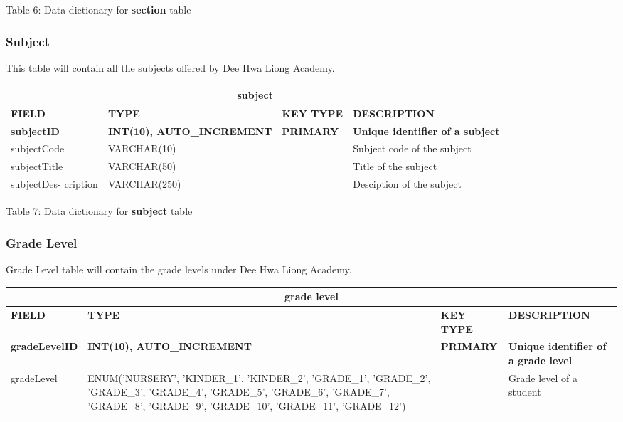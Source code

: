 \documentclass[11pt,a4paper,titlepage]{article}
\begin{document}
\vspace{.5cm}
\begin{center}
    Table 6: Data dictionary for \textbf{section} table
\end{center}

\newpage

\subsubsection{Subject}

This table will contain all the subjects offered by Dee Hwa Liong Academy.

\vspace{1cm}
\begin{longtable}{ |p{2.5cm}|p{4.5cm}|p{2.5cm}|p{3cm}|  }
    \hline
    \multicolumn{4}{|c|}{\textbf{subject}} \\
    \hline
    \textbf{FIELD}&\textbf{TYPE}&\textbf{KEY TYPE}&\textbf{DESCRIPTION}\\
    \hline
    \textbf{subjectID}   & \textbf{INT(10), AUTO\_INCREMENT} & \textbf{PRIMARY} & \textbf{Unique identifier of a subject}\\ \hline
    subjectCode & VARCHAR(10) & & Subject code of the subject \\ \hline
    subjectTitle & VARCHAR(50) & & Title of the subject \\ \hline
    subjectDes- cription & VARCHAR(250) & & Desciption of the subject \\ \hline
\end{longtable}

\vspace{.5cm}
\begin{center}
    Table 7: Data dictionary for \textbf{subject} table
\end{center}

\newpage

\subsubsection{Grade Level}

Grade Level table will contain the grade levels under Dee Hwa Liong Academy.

\vspace{1cm}
\begin{longtable}{ |p{2.5cm}|p{4.5cm}|p{2.5cm}|p{3cm}|  }
    \hline
    \multicolumn{4}{|c|}{\textbf{grade level}} \\
    \hline
    \textbf{FIELD}&\textbf{TYPE}&\textbf{KEY TYPE}&\textbf{DESCRIPTION}\\
    \hline
    \textbf{gradeLevelID}   & \textbf{INT(10), AUTO\_INCREMENT} & \textbf{PRIMARY} & \textbf{Unique identifier of a grade level}\\ \hline
    gradeLevel & ENUM('NURSERY', 'KINDER\_1', 'KINDER\_2', 'GRADE\_1', 'GRADE\_2', 'GRADE\_3', 'GRADE\_4', 'GRADE\_5', 'GRADE\_6', 'GRADE\_7', 'GRADE\_8', 'GRADE\_9', 'GRADE\_10', 'GRADE\_11', 'GRADE\_12') & & Grade level of a student \\ \hline
\end{longtable}
\end{document}

